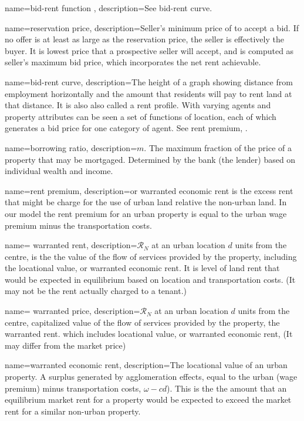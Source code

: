 {
name=bid-rent function ,
description={See \gls{bid-rent curve}.}
}

{
name=reservation price,
description={Seller's minimum price of to accept a bid. If no offer is at least as large as the reservation price, the seller is effectively the buyer. It is lowest price that a prospective seller will accept, and is computed as seller's maximum bid price, which incorporates the net rent achievable.}
}

{
name=bid-rent curve,
description={The height of a graph showing distance from employment horizontally and the amount that residents will pay to rent land at that distance. It is also also called a \gls{rent profile}. With varying agents and property attributes can be seen a set of functions of location, each of which  generates a bid price for one category of agent.   See \gls{rent premium}, .}
}

{
name=borrowing ratio,
description={$m$. The maximum fraction of the price of a property that may be mortgaged. Determined by the bank (the lender) based on individual wealth and income. }
}

{
name=rent premium,
description={or \gls{warranted economic rent} is the excess rent  that might be charge for the use of urban land relative the non-urban land. In our model the rent premium for an urban property is equal to the urban wage premium minus the transportation costs. }
}

{
name= warranted rent,
description={$\mathcal{R}_N$ at an  urban location  $d$ units from the centre, is the the value of the flow of services provided by the property, including the locational value, or \gls{warranted economic rent}. It is level of land rent that would be expected in equilibrium based on location and transportation costs.  (It may not be the rent actually charged to a tenant.) }
}

{
name= warranted price,
description={$\mathcal{R}_N$ at an  urban location  $d$ units from the centre, capitalized value of the flow of services provided by the property, the \gls{warranted rent}. 
which  includes locational value, or \gls{warranted economic rent}, (It may differ from the market price) }}

{
name=warranted economic rent,
description={The locational value of an urban property. A surplus generated by \glspl{agglomeration effect}, equal to the urban (wage premium) minus transportation costs, $\omega-{c} d$). This is the the amount that an equilibrium market rent for a property would be expected to exceed the market rent for a similar non-urban property.}
}

